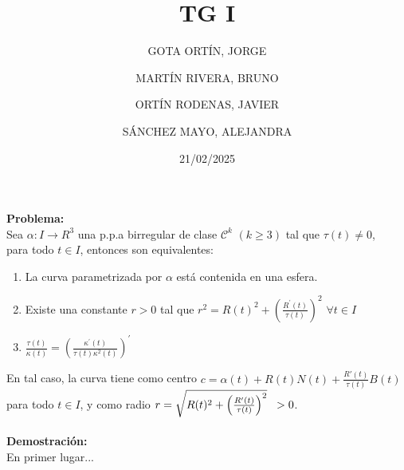 \documentclass{article}
\begin{document}
\title{TG I}
\date{21/02/2025}
\maketitle
\begin{center}
    
    \author{
    GOTA ORTÍN, JORGE \\
    \and MARTÍN RIVERA, BRUNO \\
    \and ORTÍN RODENAS, JAVIER \\
    \and SÁNCHEZ MAYO, ALEJANDRA
    }   
\end{center}
\vspace{5mm}

\noindent
\textbf{Problema:} \\[1mm]

Sea $\alpha : I \to R^3$ una p.p.a birregular de clase
$\mathcal{C}^k$ $(k \geq 3)$ tal que $\tau(t) \neq 0$, \\
para todo $t \in I$, entonces son equivalentes:

\begin{enumerate}[label=(\roman*)]
    \item La curva parametrizada por $\alpha$ está contenida en una esfera.
    \item Existe una constante $r > 0$ tal que $r^2 = R(t)^2 + \left(\frac{R^\prime(t)}{\tau(t)}\right)^2$ \hspace{2mm} $\forall t \in I$
    \item $\frac{\tau(t)}{\kappa(t)} = \left( \frac{\kappa^\prime(t)}{\tau(t) \kappa^2(t)} \right)^\prime$
\end{enumerate}
\noindent
En tal caso, la curva tiene como centro
$c = \alpha(t) + R(t)N(t) + \frac{R'(t)}{\tau(t)}B(t)$
para todo $t \in I$, y como radio
$r = \sqrt{R(t)^2 + \left( \frac{R'(t)}{\tau(t)}\right)^2} \hspace{2mm} > 0$.
\\\\[0,6cm]
\textbf{Demostración:} \\[0,2cm]
\indent En primer lugar...
\end{document}
